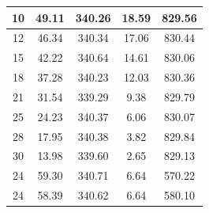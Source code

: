 \begin{table}[H]
{\begin{tabular}{|c|c|c|c|c|}
\rowcolor[HTML]{C0E6F5} 
10                                                & 49.11                             & 340.26                         & 18.59                                                          & 829.56                 \\ \hline
12                                                & 46.34                             & 340.34                         & 17.06                                                          & 830.44                 \\ \hline
15                                                & 42.22                             & 340.64                         & 14.61                                                          & 830.06                 \\ \hline
18                                                & 37.28                             & 340.23                         & 12.03                                                          & 830.36                 \\ \hline
21                                                & 31.54                             & 339.29                         & 9.38                                                           & 829.79                 \\ \hline
25                                                & 24.23                             & 340.37                         & 6.06                                                           & 830.07                 \\ \hline
28                                                & 17.95                             & 340.38                         & 3.82                                                           & 829.84                 \\ \hline
30                                                & 13.98                             & 339.60                         & 2.65                                                           & 829.13                 \\ \hline
\rowcolor[HTML]{C0E6F5} 
24                                                & 59.30                             & 340.71                         & 6.64                                                           & 570.22                 \\ \hline
24                                                & 58.39                             & 340.62                         & 6.64                                                           & 580.10                 \\ \hline

\end{tabular}}
\end{table}
